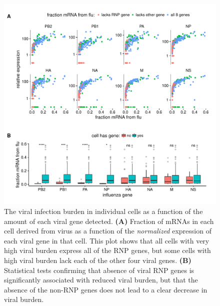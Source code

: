\documentclass[9pt,lineno]{elife}
\begin{document}
\begin{figure}
\includegraphics[width=\linewidth]{figures/p_flu_burden_flu_gene_merge.pdf}
\caption{\label{fig:fluburdenbyflugene}
The viral infection burden in individual cells as a function of the amount of each viral gene detected.
{\bf (A)} 
Fraction of mRNAs in each cell derived from virus as a function of the \emph{normalized} expression of each viral gene in that cell.
This plot shows that all cells with very high viral burden express all of the RNP genes, but some cells with high viral burden lack each of the other four viral genes.
{\bf (B)}
Statistical tests confirming that absence of viral RNP genes is significantly associated with reduced viral burden, but that the absence of the non-RNP genes does not lead to a clear decrease in viral burden.
}
\end{figure}
\end{document}
